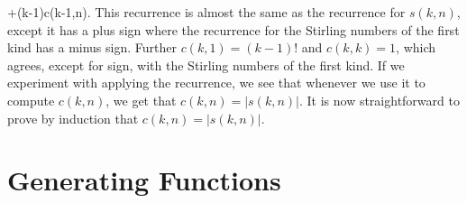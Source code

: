 \documentclass[10pt,]{book}
\theoremstyle{plain}
\theoremstyle{definition}
\numberwithin{equation}{chapter}
\begin{document}
\begin{enumerate}
+(k-1)c(k-1,n)\). This recurrence is almost the same as the recurrence for \(s(k,n)\), except it has a plus sign where the recurrence for the Stirling numbers of the first kind has a minus sign. Further \(c(k,1)=(k-1)!\) and \(c(k,k)=1\), which agrees, except for sign, with the Stirling numbers of the first kind. If we experiment with applying the recurrence, we see that whenever we use it to compute \(c(k,n)\), we get that \(c(k,n)=|s(k,n)|\). It is now straightforward to prove by induction that \(c(k,n)=|s(k,n)|\).%
%
\end{enumerate}
\typeout{************************************************}
\typeout{************************************************}
\chapter[{Generating Functions}]{Generating Functions}\label{ch_genfns}
\typeout{************************************************}
\typeout{************************************************}
\end{document}
